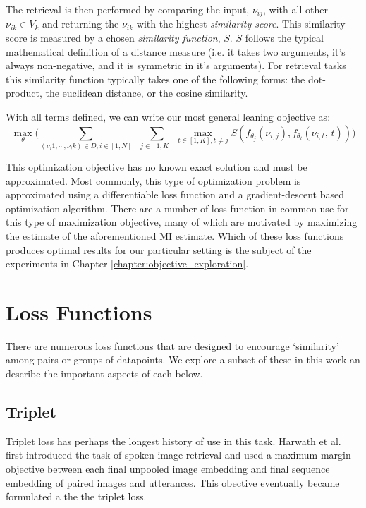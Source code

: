 The retrieval is then performed by comparing the input, $\nu_{ij}$, with all other $\nu_{ik} \in V_k$ and returning the $\nu_{ik}$ with the highest \textit{similarity score}.
This similarity score is measured by a chosen \textit{similarity function}, $S$.
$S$ follows the typical mathematical definition of a distance measure (i.e. it takes two arguments, it's always non-negative, and it is symmetric in it's arguments).
For retrieval tasks this similarity function typically takes one of the following forms: the dot-product, the euclidean distance, or the cosine similarity.

With all terms defined, we can write our most general leaning objective as:
\begin{equation}
    \underset{\theta}{\max} \Big(\sum_{(\nu_i1,\cdots, \nu_ik)\in D, i\in[1,N]} \;\; \sum_{j\in[1,K]} \underset{t\in[1,K], t\neq j }{\max} S(f_{\theta_j}(\nu_{i,j}), f_{\theta_t}(\nu_{i,t}, \,t))\Big)
\end{equation}

This optimization objective has no known exact solution and must be approximated.
Most commonly, this type of optimization problem is approximated using a differentiable loss function and a gradient-descent based optimization algorithm.
There are a number of loss-function in common use for this type of maximization objective, many of which are motivated by maximizing the estimate of the aforementioned MI estimate.
Which of these loss functions produces optimal results for our particular setting is the subject of the experiments in Chapter \ref{chapter:objective_exploration}.

\section{Loss Functions}
\label{chapter:background|section:loss_functions}
There are numerous loss functions that are designed to encourage `similarity' among pairs or groups of datapoints.
We explore a subset of these in this work an describe the important aspects of each below.
\subsection{Triplet}
\label{section:triplet}
Triplet loss has perhaps the longest history of use in this task.
Harwath et al. \cite{harwath2015deep} first introduced the task of spoken image retrieval and used a maximum margin objective between each final unpooled image embedding and final sequence embedding of paired images and utterances.
This obective eventually became formulated a the the triplet loss.

